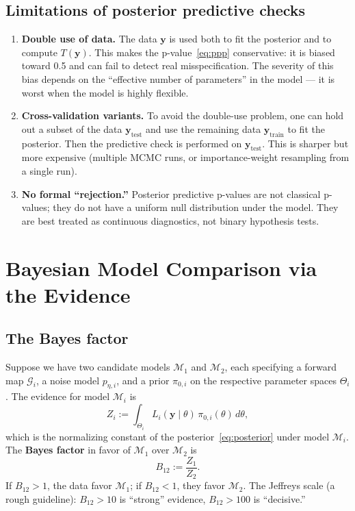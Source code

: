 \documentclass[11pt]{article}
\newcommand{\cG}{\mathcal{G}}
\newcommand{\cM}{\mathcal{M}}
\theoremstyle{plain}
\theoremstyle{remark}
\theoremstyle{definition}
\begin{document}
\subsection{Limitations of posterior predictive checks}

\begin{enumerate}[label=(\roman*)]
\item \textbf{Double use of data.} The data $\mathbf{y}$ is used both to 
  fit the posterior and to compute $T(\mathbf{y})$. This makes the 
  p-value~\eqref{eq:ppp} conservative: it is biased toward 0.5 and can 
  fail to detect real misspecification. The severity of this bias depends 
  on the ``effective number of parameters'' in the model --- it is worst 
  when the model is highly flexible.

\item \textbf{Cross-validation variants.} To avoid the double-use problem, 
  one can hold out a subset of the data $\mathbf{y}_{\text{test}}$ and use 
  the remaining data $\mathbf{y}_{\text{train}}$ to fit the posterior. Then 
  the predictive check is performed on $\mathbf{y}_{\text{test}}$. This is 
  sharper but more expensive (multiple MCMC runs, or importance-weight 
  resampling from a single run).

\item \textbf{No formal ``rejection.''} Posterior predictive p-values are 
  not classical p-values; they do not have a uniform null distribution 
  under the model. They are best treated as continuous diagnostics, not 
  binary hypothesis tests.
\end{enumerate}


\section{Bayesian Model Comparison via the Evidence}\label{sec:evidence}

\subsection{The Bayes factor}

Suppose we have two candidate models $\cM_1$ and $\cM_2$, each specifying 
a forward map $\cG_i$, a noise model $p_{\eta,i}$, and a prior $\pi_{0,i}$ 
on the respective parameter spaces $\Theta_i$. The evidence for model $\cM_i$ 
is
\begin{equation}\label{eq:evidence}
Z_i := \int_{\Theta_i} L_i(\mathbf{y} \mid \theta)\,\pi_{0,i}(\theta)\,d\theta,
\end{equation}
which is the normalizing constant of the posterior~\eqref{eq:posterior} under 
model $\cM_i$. The \textbf{Bayes factor} in favor of $\cM_1$ over $\cM_2$ is
\begin{equation}\label{eq:bayes_factor}
B_{12} := \frac{Z_1}{Z_2}.
\end{equation}
If $B_{12} > 1$, the data favor $\cM_1$; if $B_{12} < 1$, they favor $\cM_2$. 
The Jeffreys scale (a rough guideline): $B_{12} > 10$ is ``strong'' evidence, 
$B_{12} > 100$ is ``decisive.''
\end{document}
